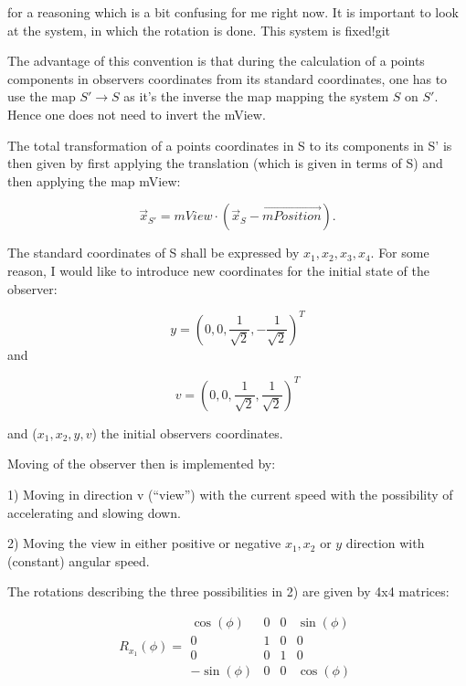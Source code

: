 \documentclass[titlepage]{scrartcl}
\begin{document}
for a reasoning which is a bit confusing for me right now. It is important to look at the system, in which the rotation is done. This system is fixed!git 

The advantage of this convention is that during the calculation of a points components in observers coordinates from its standard coordinates, one has to use the map $S' \to S$ as it's the inverse the map mapping the system $S$ on $S'$. Hence one does not need to invert the mView.

The total transformation of a points coordinates in S to its components in S' is then given by first applying the translation (which is given in terms of S) and then applying the map mView:

\begin{equation}
\vec{x}_{S'} = mView \cdot (\vec{x}_S - \vec{mPosition}).
\end{equation}

The standard coordinates of S shall be expressed by $x_1, x_2, x_3, x_4$. For some reason, I would like to introduce new coordinates for the initial state of the observer: 

\begin{equation}
y = (0, 0, \frac{1}{\sqrt{2}}, -\frac{1}{\sqrt{2}})^T
\end{equation} and

\begin{equation}
v = (0, 0, \frac{1}{\sqrt{2}}, \frac{1}{\sqrt{2}})^T
\end{equation}

and ($x_1, x_2, y, v$) the initial observers coordinates. 

Moving of the observer then is implemented by: 

1) Moving in direction v (\enquote{view}) with the current speed with the possibility of accelerating and slowing down. 

2) Moving the view in either positive or negative $x_1, x_2$ or $y$ direction with (constant) angular speed. 

The rotations describing the three possibilities in 2) are given by 4x4 matrices: 

\begin{equation}
R_{x_1}(\phi) = \begin{array}{cccc}
\cos(\phi) & 0 & 0 & \sin(\phi) \\ 
0 & 1 & 0 & 0 \\ 
0 & 0 & 1 & 0 \\ 
-\sin(\phi) & 0 & 0 & \cos(\phi)
\end{array} 
\end{equation}
\end{document}
